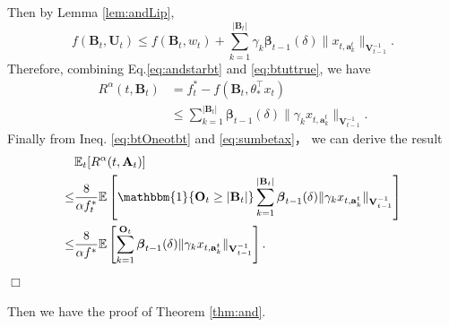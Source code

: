 \documentclass{article}
\newcommand{\bbeta}{\boldsymbol{\beta}}
\newcommand{\EE}{\mathbb{E}}
\newcommand{\bOne}{\mathbbm{1}}
\newcommand{\bA}{\mathbf{A}}
\newcommand{\ba}{\mathbf{a}}
\newcommand{\bB}{\mathbf{B}}
\newcommand{\bO}{\mathbf{O}}
\newcommand{\bU}{\mathbf{U}}
\newcommand{\bV}{\mathbf{V}}
\newcommand{\abs}[1]{\left| #1 \right|}
\newcommand{\norm}[1]{\| #1 \|}
\newenvironment{proof}{\noindent {\textbf{Proof. }}}{$\Box$ \medskip}
\begin{document}
\begin{proof}
	Then by Lemma \ref{lem:andLip},
	\begin{equation} 
		\label{eq:btuttrue}
		f(\bB_t,\bU_t) \leq f(\bB_t, w_t) + \sum_{k=1}^{\abs{\bB_t}}\gamma_k\bbeta_{t-1}(\delta)\norm{x_{t,\ba_k^t}}_{\bV_{t-1}^{-1}}.
	\end{equation}
	Therefore, combining Eq.\eqref{eq:andstarbt} and \eqref{eq:btuttrue}, we have
	\begin{align}
		R^{\alpha}(t, \bB_t) & = f_{t}^{\ast} - f(\bB_t, \theta_{\ast}^{\top}x_t) \nonumber \\
		& \leq \sum_{k=1}^{\abs{\bB_t}}\bbeta_{t-1}(\delta)\norm{\gamma_k x_{t,\ba_k^t}}_{\bV_{t-1}^{-1}}. \label{eq:sumbetax}
	\end{align}
	Finally from Ineq. \eqref{eq:btOneotbt} and \eqref{eq:sumbetax}， we can derive the result
	\begin{align*}
		&\EE_t[R^{\alpha}(t, \bA_t)] \\
		\leq& \frac{8}{\alpha f_{t}^*} \EE \left[\bOne\{ \bO_t \geq \abs{\bB_t} \}\sum_{k=1}^{\abs{\bB_t}}\bbeta_{t-1}(\delta)\norm{\gamma_k x_{t,\ba_k^t}}_{\bV_{t-1}^{-1}} \right]\\
		\leq& \frac{8}{\alpha f^*} \EE \left[ \sum_{k=1}^{ \bO_t } \bbeta_{t-1}(\delta) \norm{\gamma_k x_{t,\ba_k^t}}_{\bV_{t-1}^{-1}} \right].
	\end{align*}
\end{proof}

Then we have the proof of Theorem \ref{thm:and}.
\end{document}
